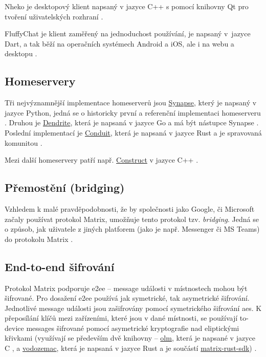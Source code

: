 Nheko je desktopový klient napsaný v jazyce C++ s pomocí knihovny Qt pro tvoření
uživatelských rozhraní \parencite{GitHub-Nheko}.

FluffyChat je klient zaměřený na jednoduchost používání, je napsaný v~jazyce
Dart, a tak běží na operačních systémech Android a iOS, ale i na webu a desktopu
\parencite{FluffyChat-Homepage,GitLab-FluffyChat}.

\subsection{Homeservery}

Tři nejvýznamnější implementace homeserverů jsou
\href{https://github.com/matrix-org/synapse/}{Synapse}, který je napsaný v
jazyce Python, jedná se o historicky první a referenční implementaci homeserveru
\parencite{GitHub-Synapse}. Druhou je
\href{https://github.com/matrix-org/dendrite/}{Dendrite}, která je napsaná v
jazyce Go a má být nástupce Synapse \parencite{GitHub-Dendrite}. Poslední
implementací je \href{https://github.com/timokoesters/conduit}{Conduit}, která
je napsaná v jazyce Rust a je spravovaná komunitou \parencite{GitHub-Conduit}.

Mezi další homeservery patří např.
\href{https://github.com/matrix-construct/construct}{Construct} v jazyce C++
\parencite{GitHub-Construct}.

\subsection{Přemostění (bridging)}

Vzhledem k malé pravděpodobnosti, že by společnosti jako Google, či Microsoft
začaly používat protokol Matrix, umožňuje tento protokol tzv. \textit{bridging}.
Jedná se o způsob, jak  uživatele z jiných platforem (jako je
např. Messenger či MS Teams) do protokolu Matrix \parencite{MatrixORG-Bridges}.

\subsection{End-to-end šifrování}\label{matrix-encryption}

Protokol Matrix podporuje \gls{e2ee} -- message události v místnostech mohou být
šifrované. Pro dosažení \gls{e2ee} používá jak symetrické, tak asymetrické
šifrování. Jednotlivé message události jsou zašifrovány pomocí symetrického
šifrování \gls{aes}. K přeposílání klíčů mezi zařízeními, které jsou v dané
místnosti, se používají to-device messages šifrované pomocí asymetrické
kryptografie nad eliptickými křivkami (využívají se především dvě knihovny --
\href{https://gitlab.matrix.org/matrix-org/olm}{olm}, která je napsané v jazyce
C \parencite{GitLab-Olm}, a
\href{https://github.com/matrix-org/vodozemac}{vodozemac}, která je napsaná v
jazyce Rust a je součástí
\href{https://github.com/matrix-org/matrix-rust-sdk}{matrix-rust-sdk})
\parencite{GitHub-MatrixRustSDK}.

